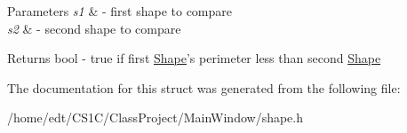 \begin{DoxyParams}{Parameters}
{\em s1} & -\/ first shape to compare \\
\hline
{\em s2} & -\/ second shape to compare\\
\hline
\end{DoxyParams}
\begin{DoxyReturn}{Returns}
bool -\/ true if first \hyperlink{classShape}{Shape}'s perimeter less than second \hyperlink{classShape}{Shape} 
\end{DoxyReturn}


The documentation for this struct was generated from the following file\-:\begin{DoxyCompactItemize}
\item 
/home/edt/\-C\-S1\-C/\-Class\-Project/\-Main\-Window/shape.\-h\end{DoxyCompactItemize}

